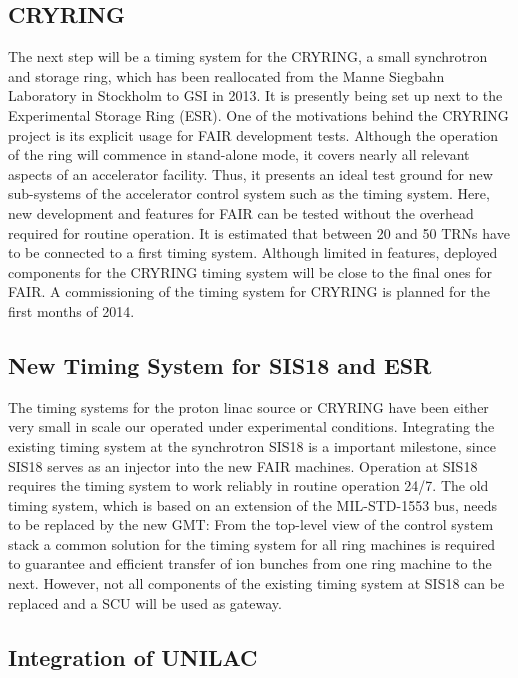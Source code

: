 \documentclass{JAC2003}
\begin{document}
\subsection{CRYRING}

 The next  step will be a  timing system
 for the CRYRING, a small  synchrotron and storage ring, which has been
 reallocated   from  the   Manne  Siegbahn   Laboratory   in  Stockholm
 \cite{cryring} to GSI  in 2013. It is presently  being set up next
 to the Experimental Storage Ring (ESR).  One of the motivations behind
 the CRYRING project is its  explicit usage for FAIR development tests.
 Although the operation of the  ring will commence in stand-alone mode,
 it  covers nearly  all relevant  aspects of  an  accelerator facility.
 Thus,  it presents an  ideal test  ground for  new sub-systems  of the
 accelerator  control system  such  as the  timing  system.  Here,  new
 development and features  for FAIR can be tested  without the overhead
 required for routine  operation.  It is estimated that  between 20 and
 50  TRNs have  to be  connected to  a first  timing  system.  Although
 limited in features, deployed components for the CRYRING timing system
 will  be close  to the  final ones  for FAIR.  A commissioning  of the
 timing system for CRYRING is planned for the first months of 2014.


\subsection{New Timing System for SIS18 and ESR}

 The timing systems for the proton linac source or  CRYRING have been 
 either very small in scale  our operated  under experimental  conditions.   
 Integrating the existing  timing  system  at  the  synchrotron SIS18  is  
 a  important milestone, since SIS18 serves as  an injector into the new FAIR machines.
 Operation  at SIS18  requires the  timing system  to work  reliably in
 routine operation 24/7.   The old timing system, which  is based on an
 extension of  the MIL-STD-1553  bus, needs to  be replaced by  the new
 GMT:  From the top-level  view of  the control  system stack  a common
 solution for  the timing system for  all ring machines  is required to
 guarantee and efficient transfer of ion bunches from one ring machine
 to the next. However, not all components of the existing timing system
 at SIS18 can be replaced and a SCU will be used as gateway.

\subsection{Integration of UNILAC}
\end{document}
